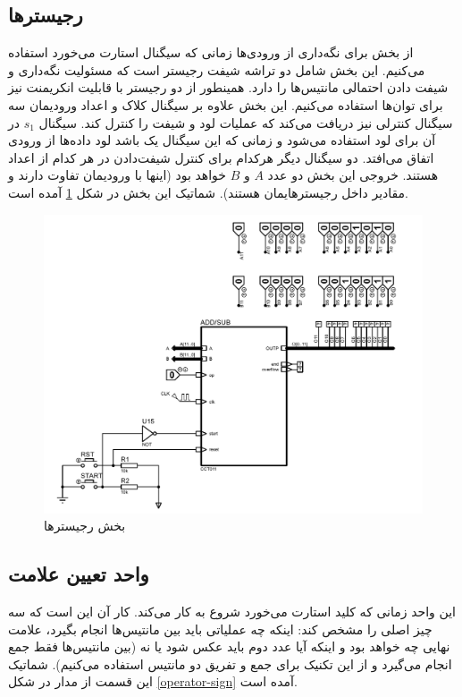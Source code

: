 \documentclass{article}
\begin{document}
\subsection{رجیستر‌ها}
از بخش  برای نگه‌داری از ورودی‌ها زمانی که سیگنال استارت می‌خورد استفاده می‌کنیم. این بخش شامل دو تراشه شیفت رجیستر است که مسئولیت نگه‌داری و شیفت دادن احتمالی مانتیس‌‌ها را دارد. همینطور از دو رجیستر با قابلیت انکریمنت نیز برای توان‌ها استفاده می‌کنیم. این بخش علاوه بر سیگنال کلاک و اعداد ورودیمان سه سیگنال کنترلی نیز دریافت می‌کند که عملیات لود و شیفت را کنترل کند. سیگنال $s_1$ در آن برای لود استفاده می‌شود و زمانی که این سیگنال یک باشد لود داده‌ها از ورودی اتفاق می‌افتد. دو سیگنال دیگر هر‌کدام برای کنترل شیفت‌دادن در هر کدام از اعداد هستند. خروجی این بخش دو عدد $A$ و $B$ خواهد بود (اینها با ورودیمان تفاوت دارند و مقادیر داخل رجیسترهایمان هستند). شماتیک این بخش در شکل \ref{registers} آمده است.

\begin{figure}
	\centering
	\includegraphics[scale=0.7, page=5]{./graphics/graphics}
	\caption{بخش رجیستر‌ها}
	\label{registers}
\end{figure}

\subsection{واحد تعیین علامت}
این واحد زمانی که کلید استارت می‌خورد شروع به کار می‌کند. کار آن این است که سه چیز اصلی را مشخص کند: اینکه چه عملیاتی باید بین مانتیس‌ها انجام بگیرد، علامت نهایی چه خواهد بود و اینکه آیا عدد دوم باید عکس شود یا نه (بین مانتیس‌ها فقط جمع انجام می‌گیرد و از این تکنیک برای جمع و تفریق دو مانتیس استفاده می‌کنیم). شماتیک این قسمت از مدار در شکل \ref{operator-sign} آمده است.
\end{document}
